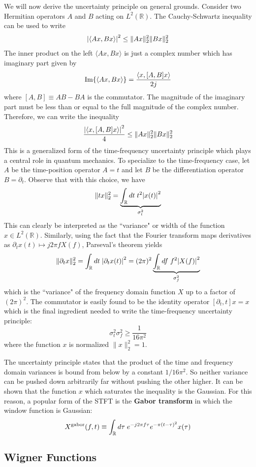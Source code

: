 \documentclass[twocolumn]{gwclass}
\newcommand{\R}{\mathbb{R}}
\begin{document}
We will now derive the uncertainty principle on general grounds. Consider two Hermitian operators $A$ and $B$ acting on $L^2(\R)$. The Cauchy-Schwartz inequality can be used to write
$$ \abs{\langle Ax, B x\rangle}^2 \leq  \| Ax\|_2^2 \|Bx\|_2^2 $$
The inner product on the left $\langle Ax, Bx\rangle$ is just a complex number which has imaginary part given by
$$ \text{\normalfont{Im}}\{  \langle Ax,Bx\rangle\} = \frac{\langle x, [A,B]x\rangle}{2j} $$
where $[A,B]\equiv AB - BA$ is the commutator. The magnitude of the imaginary part must be less than or equal to the full magnitude of the complex number. Therefore, we can write the inequality
$$ \frac{\abs{\langle x, [A,B]x\rangle}^2}{4} \leq \|Ax\|_2^2 \|Bx\|_2^2 $$
This is a generalized form of the time-frequency uncertainty principle which plays a central role in quantum mechanics. To specialize to the time-frequency case, let $A$ be the time-position operator $A=t$ and let $B$ be the differentiation operator $B=\partial_t$. Observe that with this choice, we have
$$ \|tx\|_2^2 = \underbrace{\int_\R dt\;t^2\abs{x(t)}^2}_{\sigma_t^2}$$
This can clearly be interpreted as the ``variance" or width of the function $x\in L^2(\R)$. Similarly, using the fact that the Fourier transform maps derivatives as $\partial_t x(t) \mapsto j2\pi f X(f)$, Parseval's theorem yields
$$ \|\partial_t x\|_2^2 = \int_\R dt\; \abs{\partial_t x(t)}^2 = (2\pi)^2\underbrace{\int_\R df\;f^2 \abs{X(f)}^2}_{\sigma_f^2} $$
which is the ``variance" of the frequency domain function $X$ up to a factor of $(2\pi)^2$. The commutator is easily found to be the identity operator $ [\partial_t, t]x=x  $ which is the final ingredient needed to write the time-frequency uncertainty principle:
$$ \sigma_t^2\sigma_f^2 \geq \frac{1}{16\pi^2} $$
where the function $x$ is normalized $\|x\|_2^2=1$. 

The uncertainty principle states that the product of the time and frequency domain variances is bound from below by a constant $1/16\pi^2$. So neither variance can be pushed down arbitrarily far without pushing the other higher. It can be shown that the function $x$ which saturates the inequality is the Gaussian. For this reason, a popular form of the STFT is the \textbf{Gabor transform} in which the window function is Gaussian:
$$ X^\t{gabor}(f,t) \equiv \int_\R d\tau\;e^{-j2\pi f \tau}e^{-\pi(t-\tau)^2}x(\tau) $$


\subsection{Wigner Functions}
\end{document}
